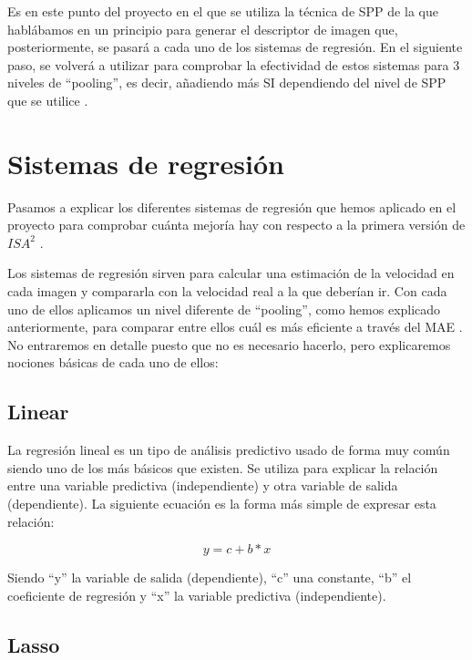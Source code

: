 Es en este punto del proyecto en el que se utiliza la técnica de \ac{SPP} \cite{spp} de la que hablábamos en un principio para generar el descriptor de imagen que, posteriormente, se pasará a cada uno de los sistemas de regresión. En el siguiente paso, se volverá a utilizar para comprobar la efectividad de estos sistemas para 3 niveles de ``pooling'', es decir, añadiendo más \ac{SI} dependiendo del nivel de \ac{SPP} que se utilice \cite{isa2}.

\section{Sistemas de regresión}

Pasamos a explicar los diferentes sistemas de regresión que hemos aplicado en el proyecto para comprobar cuánta mejoría hay con respecto a la primera versión de $ISA^{2}$ \cite{isa2}.

Los sistemas de regresión sirven para calcular una estimación de la velocidad en cada imagen y compararla con la velocidad real a la que deberían ir. Con cada uno de ellos aplicamos un nivel diferente de ``pooling'', como hemos explicado anteriormente, para comparar entre ellos cuál es más eficiente a través del \ac{MAE} \cite{mae}. No entraremos en detalle puesto que no es necesario hacerlo, pero explicaremos nociones básicas de cada uno de ellos:

\subsection{Linear}

La regresión lineal \cite{linear} es un tipo de análisis predictivo usado de forma muy común siendo uno de los más básicos que existen. Se utiliza para explicar la relación entre una variable predictiva (independiente) y otra variable de salida (dependiente). La siguiente ecuación es la forma más simple de expresar esta relación:

\begin{equation}
y = c + b*x
\end{equation}

Siendo ``y'' la variable de salida (dependiente), ``c'' una constante, ``b'' el coeficiente de regresión y ``x'' la variable predictiva (independiente).

\subsection{Lasso}

